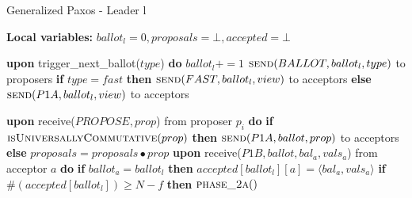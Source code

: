 \begin{algorithm} 
	\caption{Generalized Paxos - Leader l}
	\label{CFT-Lead}
	\textbf{Local variables:} $ballot_l = 0,proposals = \bot, accepted = \bot$
	\begin{algorithmic}[1]
		\State \textbf{upon} trigger\_next\_ballot($type$) \textbf{do}
		\State \hspace{\algorithmicindent} $ballot_l \mathrel{+{=}} 1$
		\State \hspace{\algorithmicindent} $\Call{send}{BALLOT,ballot_l,type}$ to proposers
		\State
		\State \hspace{\algorithmicindent} \textbf{if} $type = fast$ \textbf{then}
		\State \hspace{\algorithmicindent}\hspace{\algorithmicindent} $\Call{send}{FAST,ballot_l,view} $ to acceptors
		\State \hspace{\algorithmicindent} \textbf{else}
		\State \hspace{\algorithmicindent}\hspace{\algorithmicindent} $\Call{send}{P1A, ballot_l, view}$ to acceptors
		
		\State
		\State \textbf{upon} receive($PROPOSE, prop$) from proposer $p_i$ \textbf{do} 
		\State \hspace{\algorithmicindent} \textbf{if} $\Call{isUniversallyCommutative}{prop}$ \textbf{then}
		\State \hspace{\algorithmicindent}\hspace{\algorithmicindent} $\Call{send}{P1A, ballot, prop}$ to acceptors
		\State \hspace{\algorithmicindent} \textbf{else}
		\State \hspace{\algorithmicindent}\hspace{\algorithmicindent} $proposals = proposals \bullet prop$
		\State
		\State \textbf{upon} receive($P1B, ballot, bal_a,vals_a$) from acceptor $a$ \textbf{do}
		\State \hspace{\algorithmicindent} \textbf{if} $ballot_a = ballot_l$ \textbf{then}
		\State \hspace{\algorithmicindent}\hspace{\algorithmicindent} $accepted[ballot_l][a] =\langle bal_a, vals_a \rangle$
		\State \hspace{\algorithmicindent}\hspace{\algorithmicindent} \textbf{if} $\#(accepted[ballot_l]) \geq N-f$ \textbf{then} 
		\State \hspace{\algorithmicindent}\hspace{\algorithmicindent}\hspace{\algorithmicindent} $\Call{phase\_2a}{ }$
		

\end{algorithmic}
\end{algorithm}
